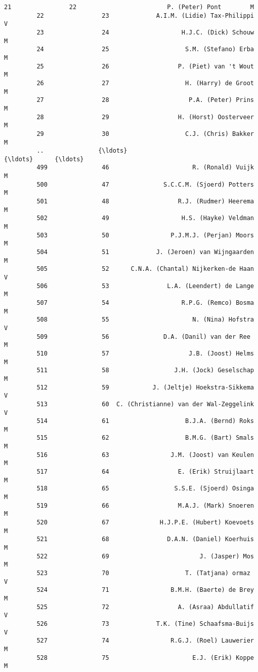 \documentclass{article}
\begin{document}
\begin{Verbatim}[commandchars=\\\{\}]
         21                22                         P. (Peter) Pont        M   
         22                23             A.I.M. (Lidie) Tax-Philippi        V   
         23                24                    H.J.C. (Dick) Schouw        M   
         24                25                     S.M. (Stefano) Erba        M   
         25                26                   P. (Piet) van 't Wout        M   
         26                27                     H. (Harry) de Groot        M   
         27                28                      P.A. (Peter) Prins        M   
         28                29                   H. (Horst) Oosterveer        M   
         29                30                     C.J. (Chris) Bakker        M   
         ..               {\ldots}                                     {\ldots}      {\ldots}   
         499               46                       R. (Ronald) Vuijk        M   
         500               47               S.C.C.M. (Sjoerd) Potters        M   
         501               48                   R.J. (Rudmer) Heerema        M   
         502               49                    H.S. (Hayke) Veldman        M   
         503               50                 P.J.M.J. (Perjan) Moors        M   
         504               51             J. (Jeroen) van Wijngaarden        M   
         505               52      C.N.A. (Chantal) Nijkerken-de Haan        V   
         506               53                L.A. (Leendert) de Lange        M   
         507               54                    R.P.G. (Remco) Bosma        M   
         508               55                       N. (Nina) Hofstra        V   
         509               56               D.A. (Danil) van der Ree        M   
         510               57                      J.B. (Joost) Helms        M   
         511               58                  J.H. (Jock) Geselschap        M   
         512               59            J. (Jeltje) Hoekstra-Sikkema        V   
         513               60  C. (Christianne) van der Wal-Zeggelink        V   
         514               61                     B.J.A. (Bernd) Roks        M   
         515               62                     B.M.G. (Bart) Smals        M   
         516               63                 J.M. (Joost) van Keulen        M   
         517               64                   E. (Erik) Struijlaart        M   
         518               65                  S.S.E. (Sjoerd) Osinga        M   
         519               66                   M.A.J. (Mark) Snoeren        M   
         520               67              H.J.P.E. (Hubert) Koevoets        M   
         521               68                D.A.N. (Daniel) Koerhuis        M   
         522               69                         J. (Jasper) Mos        M   
         523               70                     T. (Tatjana) ormaz        V   
         524               71                 B.M.H. (Baerte) de Brey        M   
         525               72                   A. (Asraa) Abdullatif        V   
         526               73             T.K. (Tine) Schaafsma-Buijs        V   
         527               74                 R.G.J. (Roel) Lauwerier        M   
         528               75                       E.J. (Erik) Koppe        M   
         

\end{Verbatim}
\end{document}
